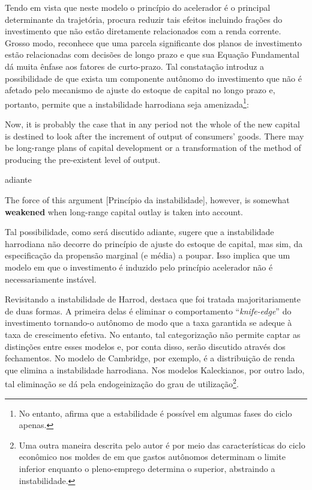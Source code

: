 
Tendo em vista que neste modelo o princípio do acelerador é o principal determinante da trajetória, \textcite[p.~26--28]{harrod_essay_1939} procura reduzir tais efeitos incluindo frações do investimento que não estão diretamente relacionados com a renda corrente. Grosso modo,  reconhece que uma parcela significante dos planos de investimento estão relacionadas com decisões de longo prazo e que sua Equação Fundamental dá muita ênfase aos fatores de curto-prazo. Tal constatação introduz a possibilidade de que exista um componente autônomo do investimento que não é afetado pelo mecanismo de ajuste do estoque de capital no longo prazo e, portanto, permite que a instabilidade harrodiana seja amenizada\footnote{No entanto, \textcite[p.~28]{harrod_essay_1939} afirma que a estabilidade é possível em algumas fases do ciclo apenas.}:

\begin{citacao}
Now, it is probably the case that in any period not the whole of the new capital is destined to look after the increment of output of consumers' goods. There may be  long-range plans of capital development or a transformation  of the method of  producing  the pre-existent level of output. \cite[p.~17]{harrod_essay_1939}
\end{citacao}
adiante
\begin{citacao}
The force  of this  argument [Princípio da instabilidade], however, is somewhat \textbf{weakened} when long-range  capital outlay is taken into account.
\cite[p.~26, grifos adicionados]{harrod_essay_1939}
\end{citacao}
Tal possibilidade, como será discutido adiante, sugere que a instabilidade harrodiana não decorre do princípio de ajuste do estoque de capital, mas sim, da especificação da propensão marginal (e média) a poupar. Isso implica que um modelo em que o investimento é induzido pelo princípio acelerador não é necessariamente instável.

Revisitando a instabilidade de Harrod, \textcite{allain_macroeconomic_2014} destaca que foi tratada majoritariamente de duas formas. A primeira delas é eliminar o comportamento  ``\textit{knife-edge}'' do investimento tornando-o autônomo de modo que a taxa garantida se adeque à taxa de crescimento efetiva. No entanto, tal categorização não permite captar as distinções entre esses modelos e, por conta disso, serão discutido através dos fechamentos. No modelo de Cambridge, por exemplo, é a distribuição de renda que elimina a instabilidade harrodiana. Nos modelos Kaleckianos, por outro lado, tal eliminação  se dá pela endogeinização do grau de utilização\footnote{Uma outra maneira descrita pelo autor é por meio das características do ciclo econômico nos moldes de \textcite{hicks_contribution_1972} em que gastos autônomos determinam o limite inferior enquanto o pleno-emprego determina o superior, abstraindo a instabilidade.}. 




